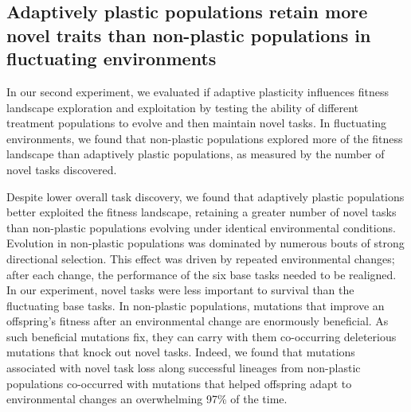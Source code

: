 \vspace{0.25cm}
\subsection{Adaptively plastic populations retain more novel traits than non-plastic populations in fluctuating environments}


In our second experiment, we evaluated if adaptive plasticity influences fitness landscape exploration and exploitation by testing the ability of different treatment populations to evolve and then maintain novel tasks. 
In fluctuating environments, we found that non-plastic populations explored more of the fitness landscape than adaptively plastic populations, as measured by the number of novel tasks discovered.

Despite lower overall task discovery, we found that adaptively plastic populations better exploited the fitness landscape, retaining a greater number of novel tasks than non-plastic populations evolving under identical environmental conditions.
Evolution in non-plastic populations was dominated by numerous bouts of strong directional selection.  
This effect was driven by repeated environmental changes; after each change, the performance of the six base tasks needed to be realigned. 
In our experiment, novel tasks were less important to survival than the fluctuating base tasks.
In non-plastic populations, mutations that improve an offspring's fitness after an environmental change are enormously beneficial. 
As such beneficial mutations fix, they can carry with them co-occurring deleterious mutations that knock out novel tasks. %
Indeed, we found that mutations associated with novel task loss along successful lineages from non-plastic populations co-occurred with mutations that helped offspring adapt to environmental changes an overwhelming 97\% of the time.


